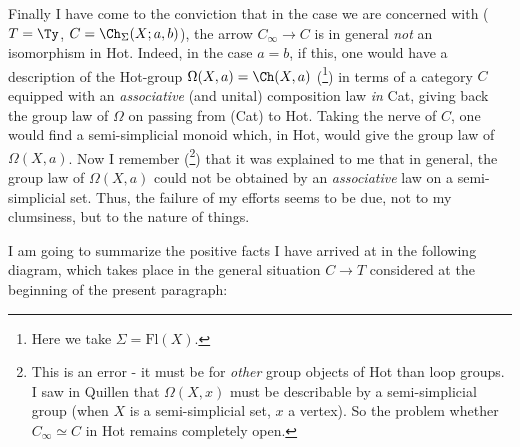 Finally I have come to the conviction that in the case we are concerned with ($T = \Ty$, $C = \Ch_{\Sigma}(X;a,b)$), the arrow $C_{\infty} \longrightarrow C$ is in general \textit{not} an isomorphism in Hot. Indeed, in the case $a = b$, if this,
one would have a description of the Hot-group $\Omega(X,a) = \Ch(X,a)$ (\footnote[23]{Here we take $\Sigma = \mathrm{Fl}(X)$.}) in terms of a category $C$ equipped with an \textit{associative} (and unital) composition law \textit{in} Cat, giving back the group law of $\Omega$ on passing from (Cat) to Hot. Taking the nerve of $C$, one would find a semi-simplicial monoid which, in Hot, would give the group law of $\Omega(X,a)$. Now I remember (\footnote[24]{This is an error - it must be for \textit{other} group objects of Hot than loop groups. I saw in Quillen that $\Omega(X,x)$ must be describable by a semi-simplicial group (when $X$ is a semi-simplicial set, $x$ a vertex). So the problem whether $C_{\infty} \simeq C$ in Hot remains completely open.}) that it was explained to me that in general, the group law of $\Omega(X,a)$ could not be obtained by an \textit{associative} law on a semi-simplicial set. Thus, the failure of my efforts seems to be due, not to my clumsiness, but to the nature of things. %

I am going to summarize the positive facts I have arrived at in the following diagram, which takes place in the general situation $C \longrightarrow T$ considered at the beginning of the present paragraph:

